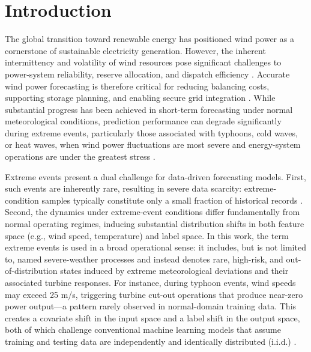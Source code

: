 \documentclass[a4paper]{cas-sc}
\begin{document}
\maketitle

\section{Introduction}

The global transition toward renewable energy has positioned wind power as a cornerstone of sustainable electricity generation. However, the inherent intermittency and volatility of wind resources pose significant challenges to power-system reliability, reserve allocation, and dispatch efficiency \citep{yuan2023conditional}. Accurate wind power forecasting is therefore critical for reducing balancing costs, supporting storage planning, and enabling secure grid integration \citep{yan2025economic, wang2025ensemble}. While substantial progress has been achieved in short-term forecasting under normal meteorological conditions, prediction performance can degrade significantly during extreme events, particularly those associated with typhoons, cold waves, or heat waves, when wind power fluctuations are most severe and energy-system operations are under the greatest stress \citep{wang2024scarcity, jonkers2024regional}.

Extreme events present a dual challenge for data-driven forecasting models. First, such events are inherently rare, resulting in severe data scarcity: extreme-condition samples typically constitute only a small fraction of historical records \citep{s41597-022-01696-6, wang2024scarcity}. Second, the dynamics under extreme-event conditions differ fundamentally from normal operating regimes, inducing substantial distribution shifts in both feature space (e.g., wind speed, temperature) and label space. In this work, the term extreme events is used in a broad operational sense: it includes, but is not limited to, named severe-weather processes and instead denotes rare, high-risk, and out-of-distribution states induced by extreme meteorological deviations and their associated turbine responses. For instance, during typhoon events, wind speeds may exceed 25 m/s, triggering turbine cut-out operations that produce near-zero power output---a pattern rarely observed in normal-domain training data. This creates a covariate shift in the input space and a label shift in the output space, both of which challenge conventional machine learning models that assume training and testing data are independently and identically distributed (i.i.d.) \citep{dong2023mdan, yin2021serioparallel}.
\end{document}
